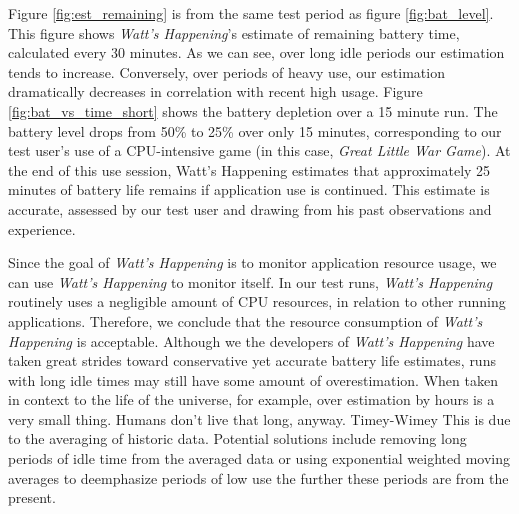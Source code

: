 Figure \ref{fig:est_remaining} is from the same test period as figure \ref{fig:bat_level}.
This figure shows \emph{Watt's Happening}'s estimate of remaining battery time, calculated every 30 minutes.
As we can see, over long idle periods our estimation tends to increase.
Conversely, over periods of heavy use, our estimation dramatically decreases in correlation with recent high usage.
Figure \ref{fig:bat_vs_time_short} shows the battery depletion over a 15 minute run.
The battery level drops from 50\% to 25\% over only 15 minutes, corresponding to our test user's use of a CPU-intensive game (in this case, \emph{Great Little War Game}\cite{glwg}).
At the end of this use session, Watt's Happening estimates that approximately 25 minutes of battery life remains if application use is continued.
This estimate is accurate, assessed by our test user and drawing from his past observations and experience.

Since the goal of \emph{Watt's Happening} is to monitor application resource usage, we can use  \emph{Watt's Happening} to monitor itself.
In our test runs, \emph{Watt's Happening} routinely uses a negligible amount of CPU resources, in relation to other running applications.
Therefore, we conclude that the resource consumption of \emph{Watt's Happening} is acceptable.
Although we the developers of \emph{Watt's Happening} have taken great strides toward conservative yet accurate battery life estimates, runs with long idle times may still have some amount of overestimation.
%
When taken in context to the life of the universe, for example, over estimation by hours is a very small thing. 
Humans don't live that long, anyway.
Timey-Wimey   %
%
This is due to the averaging of historic data.  
Potential solutions include removing long periods of idle time from the averaged data or using exponential weighted moving averages to deemphasize periods of low use the further these periods are from the present.

